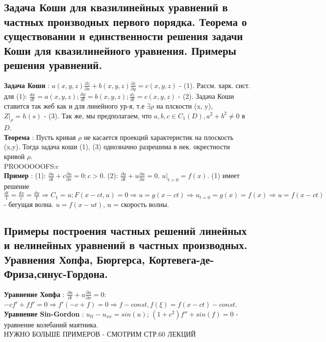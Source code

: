 \documentclass[unicode, 8pt, a4paper,oneside, landscape]{article}
\begin{document}
\begin{multicols}{4}
\subsection{Задача Коши для квазилинейных  уравнений в частных производных первого порядка. Теорема о существовании и единственности решения задачи Коши для квазилинейного уравнения. Примеры решения уравнений.}

{\bf Задача Коши} : $a(x, y, z)\frac{\partial z}{\partial x} + b(x, y, z)\frac{\partial z}{\partial y} = c(x, y, z)$ - (1). Рассм. харк. сист. для (1): $\frac{dx}{dt} = a(x, y, z); \frac{dy}{dt} = b(x, y, z); \frac{dz}{dt} = c(x, y, z)$ - (2). Задача Коши ставится так жеб как и для линейного ур-я, т.е $\exists \rho$ на плскости (x, y), $Z|_\rho = h(s)$ - (3). Так же, мы предполагаем, что $a, b, c \in C_1(D), a^2 + b^2 \neq 0$ в $D$.\\
{\bf Теорема} : Пусть кривая $\rho$ не касается проекций характеристик на плоскость (x,y). Тогда задача коши (1), (3) однозначно разрешима в нек. окрестности кривой $\rho$.\\ PROOOOOOFS:c\\
{\bf Пример} : (1): $\frac{\partial u}{\partial t} + c\frac{\partial u}{\partial x} = 0: c>0$. (2): $\frac{\partial u}{\partial t} + u\frac{\partial u}{\partial x} = 0$. $u|_{t=0} = f(x)$. (1) имеет решение $\frac{dt}{1} = \frac{dx}{c} = \frac{du}{t} \Rightarrow C_1 = u; F(x-ct, u) = 0 \Rightarrow u = g(x-ct) \Rightarrow u_{t=0} = g(x) = f(x) \Rightarrow u =f(x-ct)$ - бегущая волна. $u=f(x - ut)$, u = скорость волны. 

\subsection{Примеры построения частных решений линейных и нелинейных уравнений в частных производных. Уравнения Хопфа, Бюргерса, Кортевега-де-Фриза,синус-Гордона.}

{\bf Уравнение Хопфа} : $\frac{\partial u}{\partial t} + u\frac{\partial u}{\partial x} = 0$: $-cf' + ff' = 0 \Rightarrow f'(-c+f) = 0 \Rightarrow f - const, f(\xi) = f(x-ct) - const$.\\
{\bf Уравнение Sin-Gordon} : $u_{tt} - u_{xx} = sin(u)$; $(1+c^2)f'' + sin(f) = 0$ - уравнение колебаний маятника.\\
НУЖНО БОЛЬШЕ ПРИМЕРОВ - СМОТРИМ СТР.60 ЛЕКЦИЙ



\end{multicols}
\end{document}
